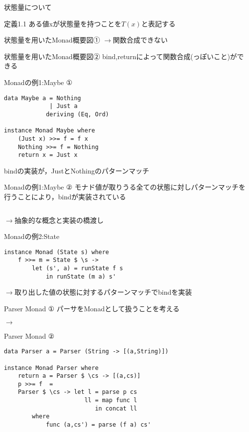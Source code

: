 \documentclass[uplatex,dvipdfmx,ja=standard]{beamer}
\begin{document}
\begin{frame}{状態量について}
    \begin{block}{定義1.1}
    ある値xが状態量を持つことを$T(x)$と表記する
    \end{block}
\end{frame}

\begin{frame}{状態量を用いたMonad概要図①}
    $\to$関数合成できない
\end{frame}

\begin{frame}{状態量を用いたMonad概要図②}
    bind,returnによって関数合成(っぽいこと)ができる
\end{frame}

\begin{frame}[fragile]{Monadの例1:Maybe ①}
    \begin{verbatim}
data Maybe a = Nothing
             | Just a 
            deriving (Eq, Ord)
    
instance Monad Maybe where
    (Just x) >>= f = f x
    Nothing >>= f = Nothing
    return x = Just x
    \end{verbatim}
    bindの実装が，JustとNothingのパターンマッチ
\end{frame}

\begin{frame}[fragile]{Monadの例1:Maybe ②}
    モナド値が取りうる全ての状態に対しパターンマッチを行うことにより，bindが実装されている
    \begin{verbatim}

    \end{verbatim}
    $\to$抽象的な概念と実装の橋渡し
\end{frame}

\begin{frame}[fragile]{Monadの例2:State}
    \begin{verbatim}
instance Monad (State s) where
    f >>= m = State $ \s ->
        let (s', a) = runState f s
            in runState (m a) s'

    \end{verbatim}
    $\to$取り出した値の状態に対するパターンマッチでbindを実装
\end{frame}

\begin{frame}[fragile]{Parser Monad ①}
    パーサをMonadとして扱うことを考える

    $\to$
\end{frame}

\begin{frame}[fragile]{Parser Monad ②}
    \begin{verbatim}
data Parser a = Parser (String -> [(a,String)])

instance Monad Parser where
    return a = Parser $ \cs -> [(a,cs)]
    p >>= f  = 
    Parser $ \cs -> let l = parse p cs
                       ll = map func l
                          in concat ll
        where
            func (a,cs') = parse (f a) cs'
    \end{verbatim}
\end{frame}
\end{document}
